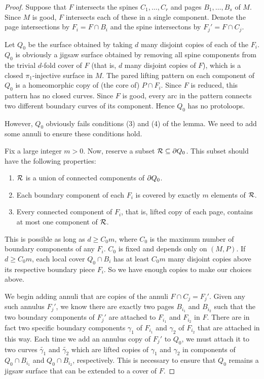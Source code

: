 \begin{proof}

Suppose that $F$ intersects the spines $C_1,\dots,C_r$ and pages
$B_1,\dots,B_s$ of $M$.  Since $M$ is good, $F$ intersects each of these in
a single component.  Denote the page intersections by $F_i = F \cap B_i$ and
the spine intersectons by $F_j' = F \cap C_j$.

Let $Q_0$ be the surface obtained by taking $d$ many disjoint copies of each of
the $F_i$. $Q_0$ is obviously a jigsaw surface obtained by
removing all spine components from the trivial $d$-fold cover of $F$ (that is,
$d$ many disjoint copies of $F$), which is a closed $\pi_1$-injective surface
in $M$.  The pared lifting pattern on each component of $Q_0$ is a homeomorphic
copy of (the core of) $P \cap F_i$. Since $F$ is reduced, this pattern has no
closed curves.  Since $F$ is good, every arc in the pattern connects two
different boundary curves of its component. Hence $Q_0$ has no protoloops.

However, $Q_0$ obviously fails conditions (3) and (4) of the lemma. We need to
add some annuli to ensure these conditions hold.

Fix a large integer $m>0$. Now, reserve a subset $\mathcal{R} \subseteq \partial Q_0$.  This
subset should have the following properties:

\begin{enumerate}

\item $\mathcal{R}$ is a union of connected components of $\partial Q_0$.

\item Each boundary component of each $F_i$ is covered by exactly $m$ elements
of $\mathcal{R}$.

\item Every connected component of $F_i$, that is, lifted copy of each page,
contains at most one component of $\mathcal{R}$.

\end{enumerate}

This is possible as long as $d \geq C_0m$, where $C_0$ is the maximum number of
boundary components of any $F_i$. $C_0$ is fixed and depends only on $(M,P)$.
If $d\geq C_0m$,  each local cover $Q_0 \cap B_i$ has at least $C_0m$ many
disjoint copies above its respective boundary piece $F_i$.  So we have enough
copies to make our choices above.

We begin adding annuli that are copies of the annuli $F \cap C_j = F_j'$. Given
any such annulus $F_j'$, we know there are exactly two pages $B_{i_1}$ and
$B_{i_2}$ such that the two boundary components of $F_j'$ are attached to
$F_{i_1}$ and $F_{i_2}$ in $F$.  There are in fact two specific boundary
components $\gamma_1$ of $F_{i_1}$ and $\gamma_2$ of $F_{i_2}$ that are
attached in this way.  Each time we add an annulus copy of $F_j'$ to $Q_0$, we
must attach it to two curves $\widetilde{\gamma_1}$ and $\widetilde{\gamma_2}$
which are lifted copies of $\gamma_1$ and $\gamma_2$ in components of $Q_0 \cap
B_{i_1}$ and $Q_0 \cap B_{i_2}$, respectively.  This is necessary to ensure
that $Q_0$ remains a jigsaw surface that can be extended to a cover of $F$.


\end{proof}
